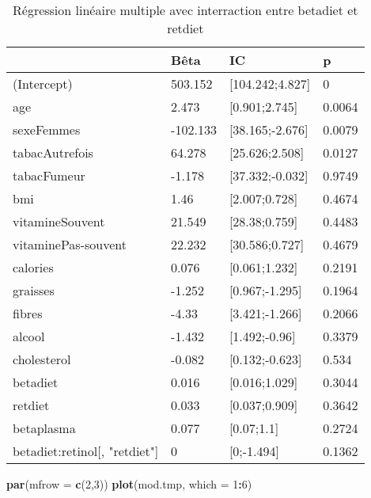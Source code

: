 \documentclass[]{article}
\newenvironment{Shaded}{\begin{snugshade}}{\end{snugshade}}
\newcommand{\KeywordTok}[1]{\textcolor[rgb]{0.13,0.29,0.53}{\textbf{#1}}}
\newcommand{\DataTypeTok}[1]{\textcolor[rgb]{0.13,0.29,0.53}{#1}}
\newcommand{\DecValTok}[1]{\textcolor[rgb]{0.00,0.00,0.81}{#1}}
\newcommand{\OperatorTok}[1]{\textcolor[rgb]{0.81,0.36,0.00}{\textbf{#1}}}
\newcommand{\NormalTok}[1]{#1}
\begin{document}
\begin{table}

\caption{\label{tab:unnamed-chunk-79}Régression linéaire multiple avec interraction entre betadiet et retdiet}
\centering
\begin{tabular}[t]{l|l|l|l}
\hline
  & Bêta & IC & p\\
\hline
\rowcolor[HTML]{BBD2E1}  (Intercept) & 503.152 & [104.242;4.827] & 0\\
\hline
age & 2.473 & [0.901;2.745] & 0.0064\\
\hline
\rowcolor[HTML]{BBD2E1}  sexeFemmes & -102.133 & [38.165;-2.676] & 0.0079\\
\hline
tabacAutrefois & 64.278 & [25.626;2.508] & 0.0127\\
\hline
\rowcolor[HTML]{BBD2E1}  tabacFumeur & -1.178 & [37.332;-0.032] & 0.9749\\
\hline
bmi & 1.46 & [2.007;0.728] & 0.4674\\
\hline
\rowcolor[HTML]{BBD2E1}  vitamineSouvent & 21.549 & [28.38;0.759] & 0.4483\\
\hline
vitaminePas-souvent & 22.232 & [30.586;0.727] & 0.4679\\
\hline
\rowcolor[HTML]{BBD2E1}  calories & 0.076 & [0.061;1.232] & 0.2191\\
\hline
graisses & -1.252 & [0.967;-1.295] & 0.1964\\
\hline
\rowcolor[HTML]{BBD2E1}  fibres & -4.33 & [3.421;-1.266] & 0.2066\\
\hline
alcool & -1.432 & [1.492;-0.96] & 0.3379\\
\hline
\rowcolor[HTML]{BBD2E1}  cholesterol & -0.082 & [0.132;-0.623] & 0.534\\
\hline
betadiet & 0.016 & [0.016;1.029] & 0.3044\\
\hline
\rowcolor[HTML]{BBD2E1}  retdiet & 0.033 & [0.037;0.909] & 0.3642\\
\hline
betaplasma & 0.077 & [0.07;1.1] & 0.2724\\
\hline
\rowcolor[HTML]{BBD2E1}  betadiet:retinol[, "retdiet"] & 0 & [0;-1.494] & 0.1362\\
\hline
\end{tabular}
\end{table}

\begin{Shaded}
\begin{Highlighting}[]
\KeywordTok{par}\NormalTok{(}\DataTypeTok{mfrow =} \KeywordTok{c}\NormalTok{(}\DecValTok{2}\NormalTok{,}\DecValTok{3}\NormalTok{))}
\KeywordTok{plot}\NormalTok{(mod.tmp, }\DataTypeTok{which =} \DecValTok{1}\OperatorTok{:}\DecValTok{6}\NormalTok{)}
\end{Highlighting}
\end{Shaded}
\end{document}
